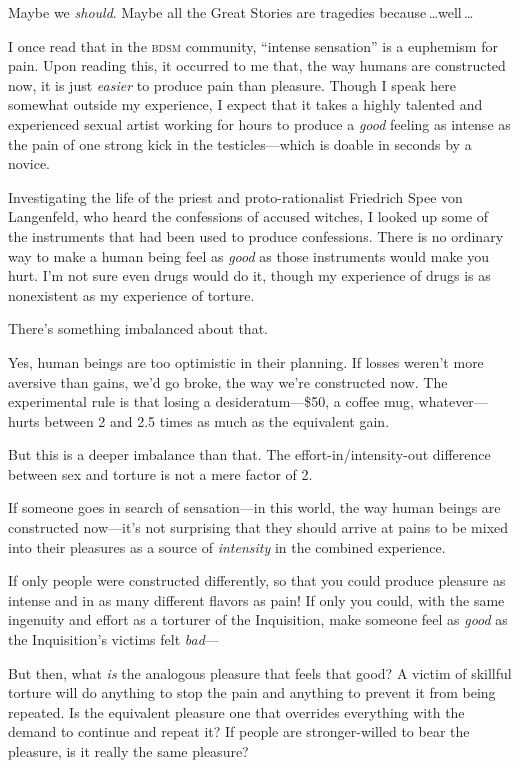  Maybe we \textit{should}. Maybe all the Great Stories are
tragedies because\,\ldots well\,\ldots


 I once read that in the \textsc{bdsm} community, ``intense
sensation'' is a euphemism for pain. Upon reading
this, it occurred to me that, the way humans are constructed now, it is
just \textit{easier} to produce pain than pleasure. Though I speak here
somewhat outside my experience, I expect that it takes a highly
talented and experienced sexual artist working for hours to produce a
\textit{good} feeling as intense as the pain of one strong kick in the
testicles---which is doable in seconds by a novice.


 Investigating the life of the priest and proto-rationalist
Friedrich Spee von Langenfeld, who heard the confessions of accused
witches, I looked up some of the instruments that had been used to
produce confessions. There is no ordinary way to make a human being
feel as \textit{good} as those instruments would make you hurt.
I'm not sure even drugs would do it, though my
experience of drugs is as nonexistent as my experience of torture.


 There's something imbalanced about that.


 Yes, human beings are too optimistic in their planning. If losses
weren't more aversive than gains, we'd
go broke, the way we're constructed now. The
experimental rule is that losing a desideratum---\$50, a coffee mug,
whatever---hurts between 2 and 2.5 times as much as the equivalent
gain.


 But this is a deeper imbalance than that. The
effort-in/intensity-out difference between sex and torture is not a
mere factor of 2.


 If someone goes in search of sensation---in this world, the way
human beings are constructed now---it's not surprising
that they should arrive at pains to be mixed into their pleasures as a
source of \textit{intensity} in the combined experience.


 If only people were constructed differently, so that you could
produce pleasure as intense and in as many different flavors as pain!
If only you could, with the same ingenuity and effort as a torturer of
the Inquisition, make someone feel as \textit{good} as the
Inquisition's victims felt \textit{bad}{}---


 But then, what \textit{is} the analogous pleasure that feels that
good? A victim of skillful torture will do anything to stop the pain
and anything to prevent it from being repeated. Is the equivalent
pleasure one that overrides everything with the demand to continue and
repeat it? If people are stronger-willed to bear the pleasure, is it
really the same pleasure?


